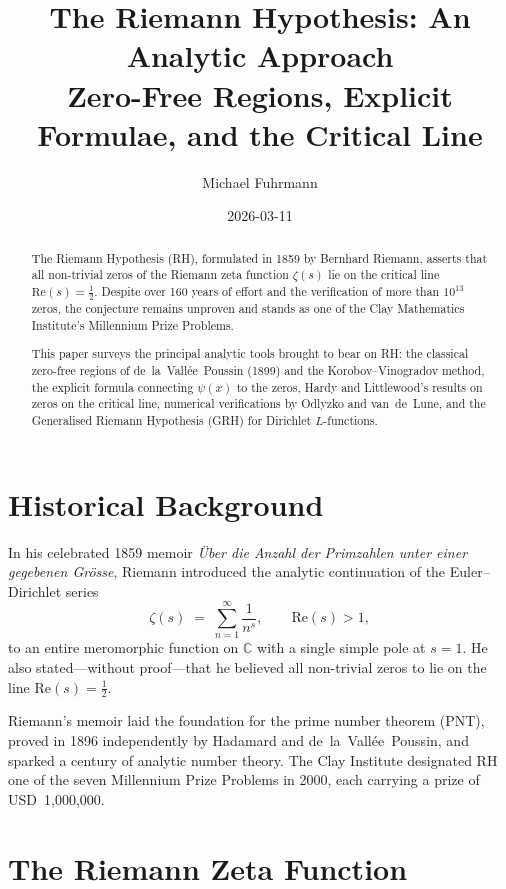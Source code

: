 \documentclass[12pt,a4paper]{article}
\title{\textbf{The Riemann Hypothesis: An Analytic Approach}\\[0.5em]
\large Zero-Free Regions, Explicit Formulae, and the Critical Line}
\author{Michael Fuhrmann}
\date{2026-03-11}
\theoremstyle{remark}
\begin{document}
\maketitle
\begin{abstract}
The Riemann Hypothesis (RH), formulated in 1859 by Bernhard Riemann, asserts that
all non-trivial zeros of the Riemann zeta function $\zeta(s)$ lie on the critical line
$\mathrm{Re}(s) = \tfrac{1}{2}$.  Despite over 160 years of effort and the verification
of more than $10^{13}$ zeros, the conjecture remains unproven and stands as one of the
Clay Mathematics Institute's Millennium Prize Problems.

This paper surveys the principal analytic tools brought to bear on RH: the classical
zero-free regions of de~la~Vallée~Poussin (1899) and the Korobov--Vinogradov method,
the explicit formula connecting $\psi(x)$ to the zeros, Hardy and Littlewood's results
on zeros on the critical line, numerical verifications by Odlyzko and van~de~Lune, and
the Generalised Riemann Hypothesis (GRH) for Dirichlet $L$-functions.
\end{abstract}

\tableofcontents
\newpage

\section{Historical Background}

In his celebrated 1859 memoir \textit{Über die Anzahl der Primzahlen unter einer gegebenen Grösse},
Riemann introduced the analytic continuation of the Euler--Dirichlet series
\[
  \zeta(s) \;=\; \sum_{n=1}^{\infty} \frac{1}{n^s}, \qquad \mathrm{Re}(s) > 1,
\]
to an entire meromorphic function on $\mathbb{C}$ with a single simple pole at $s=1$.
He also stated—without proof—that he believed all non-trivial zeros to lie on the line
$\mathrm{Re}(s) = \tfrac{1}{2}$.

Riemann's memoir laid the foundation for the prime number theorem (PNT), proved in 1896
independently by Hadamard and de~la~Vallée~Poussin, and sparked a century of analytic
number theory.  The Clay Institute designated RH one of the seven Millennium Prize
Problems in 2000, each carrying a prize of USD~1{,}000{,}000.

\section{The Riemann Zeta Function}
\end{document}
